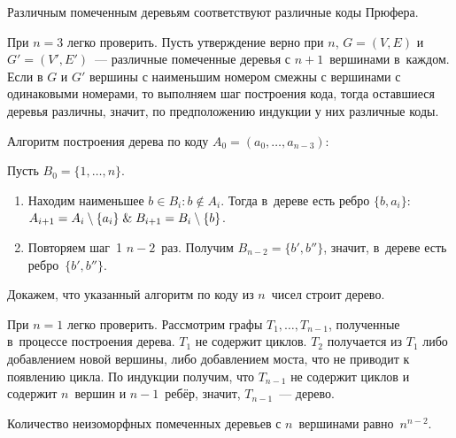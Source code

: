 \begin{statement}
Различным помеченным деревьям соответствуют различные коды Прюфера.
\end{statement}
\begin{proofmathind}
	\indbase При $n = 3$ легко проверить.
	\indstep Пусть утверждение верно при $n$, $G = (V, E)$ и $G' = (V', E')$~--- различные помеченные деревья с $n + 1$~вершинами в~каждом.
	Если в $G$ и $G'$ вершины с наименьшим номером смежны с вершинами с одинаковыми номерами, то выполняем шаг построения кода, тогда оставшиеся деревья различны, значит, по предположению индукции у них различные коды. \indend
\end{proofmathind}

Алгоритм построения дерева по коду $A_0 = (a_0, \ldots, a_{n-3})$:

Пусть $B_0 = \{ 1, \ldots, n \}$.
\begin{enumerate}
	\item Находим наименьшее $b \in B_i \colon b \notin A_i$.
	Тогда в~дереве есть ребро $\{ b, a_i \}$: $A_{i+1} = A_i \setminus \{ a_i \} \mathrel{\&} B_{i+1} = B_i \setminus \{ b \}$.
	\item Повторяем шаг~1 $n - 2$~раз.
	Получим $B_{n-2} = \{ b', b'' \}$, значит, в~дереве есть ребро~$\{ b', b'' \}$.
\end{enumerate}

Докажем, что указанный алгоритм по коду из $n$~чисел строит дерево.
\begin{proofmathind}
	\indbase При $n = 1$ легко проверить.
	\indstep Рассмотрим графы $T_1, \ldots, T_{n-1}$, полученные в~процессе построения дерева.
	$T_1$ не содержит циклов.
	$T_2$ получается из $T_1$ либо добавлением новой вершины, либо добавлением моста, что не приводит к появлению цикла.	
	По индукции получим, что $T_{n-1}$ не содержит циклов и содержит $n$~вершин и $n - 1$~ребёр, значит, $T_{n-1}$~--- дерево.
	\indend
\end{proofmathind}

\begin{theorem}[Кэли]
Количество неизоморфных помеченных деревьев с $n$~вершинами равно~$n^{n-2}$.
\end{theorem}